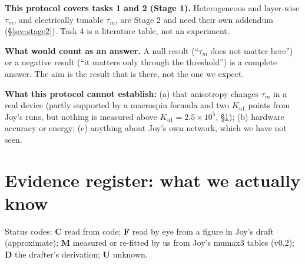 \documentclass[10pt,a4paper]{article}
\newcommand{\taum}{\tau_m}
\begin{document}
\textbf{This protocol covers tasks 1 and 2 (Stage 1).} Heterogeneous and layer-wise $\taum$, and electrically tunable $\taum$, are Stage 2 and need their own addendum (\S\ref{sec:stage2}). Task 4 is a literature table, not an experiment.

\textbf{What would count as an answer.} A null result (``$\taum$ does not matter here'') or a negative result (``it matters only through the threshold'') is a complete answer. The aim is the result that is there, not the one we expect.

\textbf{What this protocol cannot establish:} (a) that anisotropy changes $\taum$ in a real device (partly supported by a macrospin formula and two $K_{u1}$ points from Joy's runs, but nothing is measured above $K_{u1}=2.5\times10^5$, \S\ref{sec:evidence}); (b) hardware accuracy or energy; (c) anything about Joy's own network, which we have not seen.

\section{Evidence register: what we actually know}\label{sec:evidence}
Status codes: \textbf{C} read from code; \textbf{F} read by eye from a figure in Joy's draft (approximate); \textbf{M} measured or re-fitted by us from Joy's mumax3 tables (v0.2); \textbf{D} the drafter's derivation; \textbf{U} unknown.
\end{document}
